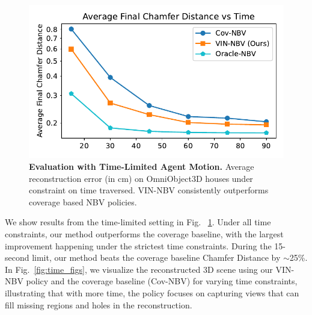 \begin{figure}
  \centering
  \vspace{-1em}
  \includegraphics[width=0.94\columnwidth]{Figures/time_constraint.pdf}
    \vspace{-1em}
    \caption{
    \textbf{Evaluation with Time-Limited Agent Motion.} Average reconstruction error (in cm) on OmniObject3D \cite{wu2023omniobject3d} houses under constraint on time traversed. VIN-NBV consistently outperforms coverage based NBV policies.
    }
    \label{fig:time_constraint}
    \vspace{0.5em}
\end{figure}

We show results from the time-limited setting in Fig. ~\ref{fig:time_constraint}. Under all time constraints, our method outperforms the coverage baseline, with the largest improvement happening under the strictest time constraints. During the 15-second limit, our method beats the coverage baseline Chamfer Distance by $\sim$25\%. In Fig.~\ref{fig:time_figs}, we visualize the reconstructed 3D scene using our VIN-NBV policy and the coverage baseline (Cov-NBV) for varying time constraints, illustrating that with more time, the policy focuses on capturing views that can fill missing regions and holes in the reconstruction.

